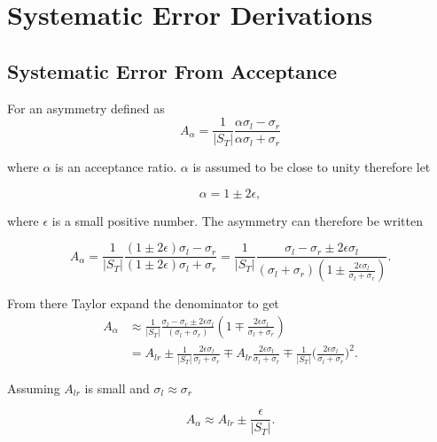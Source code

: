 \chapter{Systematic Error Derivations}
\ifpdf
\graphicspath{{Chapters/Appendix/Figs/}}
\fi

\section{Systematic Error From Acceptance} \label{app::sysAcc}

For an asymmetry defined as
\begin{equation}
  A_{\alpha} =
  \frac{1}{|S_T|}
  \frac{\alpha\sigma_l - \sigma_r}{\alpha\sigma_l + \sigma_r} 
\end{equation}

\noindent
where $\alpha$ is an acceptance ratio.  $\alpha$ is assumed to be close to unity
therefore let

\begin{equation}
  \alpha = 1 \pm 2\epsilon,
\end{equation}

\noindent
where $\epsilon$ is a small positive number.  The asymmetry can
therefore be written

\begin{equation}
  A_\alpha = \frac{1}{|S_T|}
  \frac{(1\pm2\epsilon)\sigma_l -
    \sigma_r}{(1\pm2\epsilon)\sigma_l + \sigma_r} = \frac{1}{|S_T|} \frac{\sigma_l
    - \sigma_r \pm 2\epsilon  \sigma_l}{ (\sigma_l +
    \sigma_r)(1\pm\frac{2\epsilon \sigma_l}{\sigma_l + \sigma_r}) }.
\end{equation}

\noindent
From there Taylor expand the denominator to get
\begin{align}
  A_{\alpha} &\approx
  \frac{1}{|S_T|}
  \frac{\sigma_l - \sigma_r \pm
    2\epsilon  \sigma_l}{ (\sigma_l + \sigma_r)} (1\mp\frac{2\epsilon
    \sigma_l}{\sigma_l + \sigma_r})
  \\ \nonumber
  &= 
  A_{lr}
  \pm \frac{1}{|S_T|} \frac{2\epsilon \sigma_l}{\sigma_l + \sigma_r}
  \mp A_{lr} \frac{2\epsilon \sigma_l}{\sigma_l + \sigma_r}
  \mp \frac{1}{|S_T|}
  \Big( \frac{2\epsilon \sigma_l}{\sigma_l + \sigma_r} \Big )^2.
\end{align}

\noindent
Assuming $A_{lr}$ is small and $\sigma_l \approx \sigma_r$

\begin{equation}
A_{\alpha}\approx 
A_{lr} \pm \frac{\epsilon}{|S_T|}.
\end{equation}

